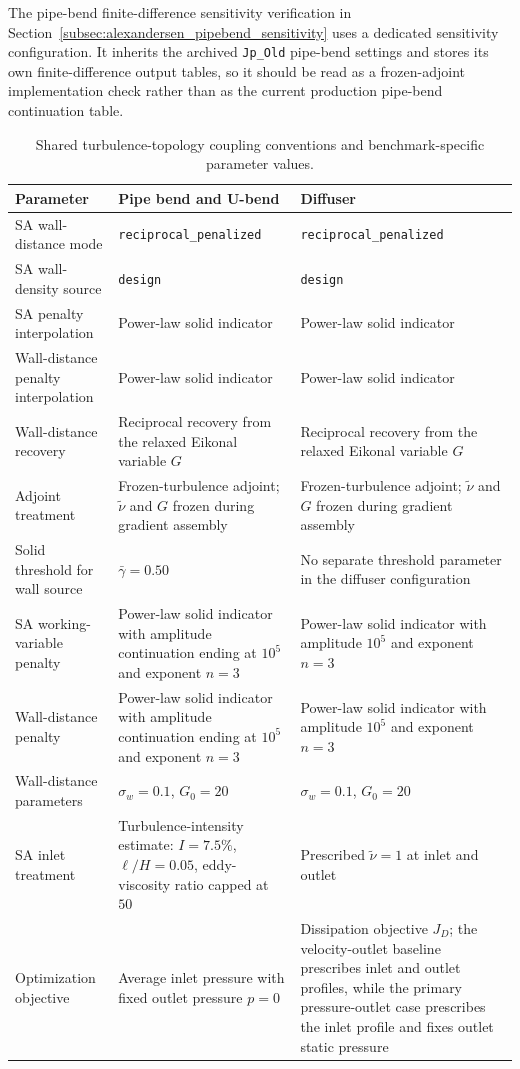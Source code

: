 The pipe-bend finite-difference sensitivity verification in Section~\ref{subsec:alexandersen_pipebend_sensitivity} uses a dedicated sensitivity configuration. It inherits the archived \texttt{Jp\_Old} pipe-bend settings and stores its own finite-difference output tables, so it should be read as a frozen-adjoint implementation check rather than as the current production pipe-bend continuation table.

\begin{table}[htbp]
	\centering
	\footnotesize
	\caption{Shared turbulence-topology coupling conventions and benchmark-specific parameter values.}
	\label{tab:app_B_shared_coupling_conventions}
	\renewcommand{\arraystretch}{1.2}
	\begin{tabularx}{\textwidth}{l X X}
		\hline
		\textbf{Parameter} & \textbf{Pipe bend and U-bend} & \textbf{Diffuser} \\
		\hline
		SA wall-distance mode & \texttt{reciprocal\_penalized} & \texttt{reciprocal\_penalized} \\
		SA wall-density source & \texttt{design} & \texttt{design} \\
		SA penalty interpolation & Power-law solid indicator & Power-law solid indicator \\
		Wall-distance penalty interpolation & Power-law solid indicator & Power-law solid indicator \\
		Wall-distance recovery & Reciprocal recovery from the relaxed Eikonal variable $G$ & Reciprocal recovery from the relaxed Eikonal variable $G$ \\
		Adjoint treatment & Frozen-turbulence adjoint; $\tilde{\nu}$ and $G$ frozen during gradient assembly & Frozen-turbulence adjoint; $\tilde{\nu}$ and $G$ frozen during gradient assembly \\
		Solid threshold for wall source & $\bar{\gamma}=0.50$ & No separate threshold parameter in the diffuser configuration \\
			SA working-variable penalty & Power-law solid indicator with amplitude continuation ending at $10^5$ and exponent $n=3$ & Power-law solid indicator with amplitude $10^5$ and exponent $n=3$ \\
			Wall-distance penalty & Power-law solid indicator with amplitude continuation ending at $10^5$ and exponent $n=3$ & Power-law solid indicator with amplitude $10^5$ and exponent $n=3$ \\
			Wall-distance parameters & $\sigma_w=0.1$, $G_0=20$ & $\sigma_w=0.1$, $G_0=20$ \\
		SA inlet treatment & Turbulence-intensity estimate: $I=7.5\%$, $\ell/H=0.05$, eddy-viscosity ratio capped at $50$ & Prescribed $\tilde{\nu}=1$ at inlet and outlet \\
		Optimization objective & Average inlet pressure with fixed outlet pressure $p=0$ & Dissipation objective $J_D$; the velocity-outlet baseline prescribes inlet and outlet profiles, while the primary pressure-outlet case prescribes the inlet profile and fixes outlet static pressure \\
		\hline
	\end{tabularx}
\end{table}

